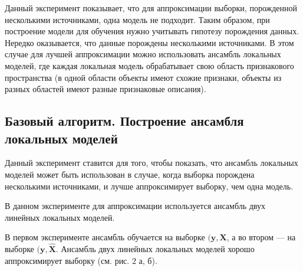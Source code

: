 \documentclass[12pt, twoside]{article}
\begin{document}
Данный эксперимент показывает, что для аппроксимации выборки, порожденной несколькими источниками, одна модель не подходит. Таким образом, при построение модели для обучения нужно учитывать гипотезу порождения данных. Нередко оказывается, что данные порождены несколькими источниками. В этом случае для лучшей аппроксимации можно использовать ансамбль локальных моделей, где каждая локальная модель обрабатывает свою область признакового пространства (в одной области объекты имеют схожие признаки, объекты из разных областей имеют разные признаковые описания).

\subsection{Базовый алгоритм. Построение ансамбля локальных моделей}

Данный эксперимент ставится для того, чтобы показать, что ансамбль локальных моделей может быть использован в случае, когда выборка порождена несколькими источниками, и лучше аппроксимирует выборку, чем одна модель.


В данном эксперименте для аппроксимации используется ансамбль двух линейных локальных моделей. 

В первом эксперименте ансамбль обучается на выборке $(\mathbf{y}, \mathbf{X}$, а во втором --- на выборке $(\mathbf{y}, \mathbf{\hat{X}}$. Ансамбль двух линейных локальных моделей хорошо аппроксимирует выборку (см. рис. $2$ а, б).  
\end{document}
